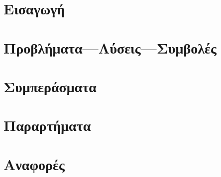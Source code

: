 





\part{Εισαγωγή}
  

\part{Προβλήματα---Λύσεις---Συμβολές}
  

\part{Συμπεράσματα}

\part{Παραρτήματα}
\begin{appendix}
  
\end{appendix}

\part{Αναφορές}
\printbibliography[heading=bibintoc,title={\textgreek{Αναφορές}}]


